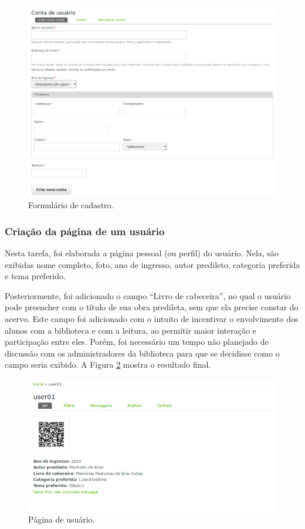 \documentclass[a4paper]{article}
\begin{document}
\begin{figure}[pbth!]
\centering
\includegraphics[width=140mm]{img/newuser.png}
\caption{Formulário de cadastro.\label{cadastro}}
\end{figure}

\subsubsection{Criação da página de um usuário}

Nesta tarefa, foi elaborada a página pessoal (ou perfil) do usuário. Nela, são exibidas nome completo, foto, ano de ingresso, autor predileto, categoria preferida e tema preferido.

Posteriormente, foi adicionado o campo “Livro de cabeceira”, no qual o usuário pode preencher com o título de sua obra predileta, sem que ela precise constar do acervo. Este campo foi adicionado com o intuito de incentivar o envolvimento dos alunos com a biblioteca e com a leitura, ao permitir maior interação e participação entre eles. Porém, foi necessário um tempo não planejado de discussão com os administradores da biblioteca para que se decidisse como o campo seria exibido. A Figura \ref{userpage} mostra o resultado final.

\begin{figure}[pbth!]
\centering
\includegraphics[width=140mm]{img/userpage.png}
\caption{Página de usuário.\label{userpage}}
\end{figure}
\end{document}

